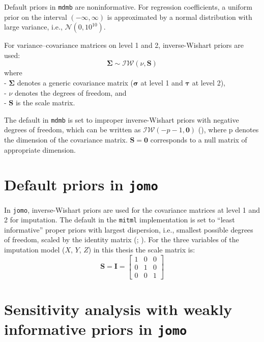 \documentclass[
  letterpaper,
  11pt,
  english,
  singlespacing,
  headsepline,
  openany]{MastersDoctoralThesis}
\begin{document}
Default priors in \texttt{mdmb} are noninformative. For regression
coefficients, a uniform prior on the interval \((-\infty, \infty)\) is
approximated by a normal distribution with large variance, i.e.,
\(\mathcal{N}(0, 10^{10})\).

For variance--covariance matrices on level 1 and 2, inverse-Wishart
priors are used: \[
\boldsymbol{\Sigma} \sim \mathcal{IW}(\nu, \mathbf{S})
\] where\\
- \(\boldsymbol{\Sigma}\) denotes a generic covariance matrix
(\(\boldsymbol{\sigma}\) at level 1 and \(\boldsymbol{\tau}\) at level
2),\\
- \(\nu\) denotes the degrees of freedom, and\\
- \(\mathbf{S}\) is the scale matrix.

The default in \texttt{mdmb} is set to improper inverse-Wishart priors
with negative degrees of freedom, which can be written as
\(\mathcal{IW}(-p-1, \mathbf{0})\) (), where p denotes the dimension of the covariance
matrix. \(\mathbf{S} = \mathbf{0}\) corresponds to a null matrix of
appropriate dimension.

\section{\texorpdfstring{Default priors in
\texttt{jomo}}{Default priors in jomo}}\label{default-priors-in-jomo}

In \texttt{jomo}, inverse-Wishart priors are used for the covariance
matrices at level 1 and 2 for imputation. The default in the
\texttt{mitml} implementation is set to ``least informative'' proper
priors with largest dispersion, i.e., smallest possible degrees of
freedom, scaled by the identity matrix (; ). For the
three variables of the imputation model (\(X\), \(Y\), \(Z\)) in this
thesis the scale matrix is: \[
\mathbf{S} = \mathbf{I} =
\begin{bmatrix}
1 & 0   & 0 \\
0   & 1 & 0 \\
0   & 0   & 1
\end{bmatrix}
\]

\section{\texorpdfstring{Sensitivity analysis with weakly informative
priors in
\texttt{jomo}}{Sensitivity analysis with weakly informative priors in jomo}}\label{sensitivity-analysis-with-weakly-informative-priors-in-jomo}
\end{document}

